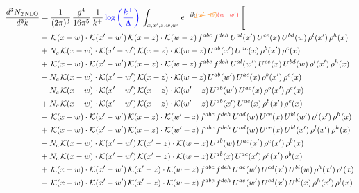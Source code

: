 \documentclass[9pt]{article}
\numberwithin{equation}{section}
\begin{document}
\begin{align}
\frac{d^{3}N_{2\,\mathrm{NLO}}}{d^{3}k} & = \frac{1}{(2\pi)^{3}}\,\frac{g^{4}}{16\pi^{5}}\,\frac{1}{k^{+}}\,{\color{blue}\log{\left(\frac{k^{+}}{\Lambda}\right)}}\,\int_{x,x',z,w,w'}e^{-ik{\color{orange}\cancel{(w'-w)}}{\color{red}(w-w')}}\,\Bigg[\notag\\ & -\,\mathcal{K}(x-w)\cdot\mathcal{K}(x'-w')\,\mathcal{K}(x-z)\cdot\mathcal{K}(w-z)\,f^{abc}\,f^{deh}\,U^{al}(x')\,U^{ce}(x)\,U^{bd}(w)\,\rho^{l}(x')\,\rho^{h}(x)\notag\\
& +N_{c}\,\mathcal{K}(x-w)\cdot\mathcal{K}(x'-w')\,\mathcal{K}(x-z)\cdot\mathcal{K}(w-z)\,U^{ab}(x')\,U^{ac}(x)\,\rho^{b}(x')\,\rho^{c}(x)\notag\\
& +\,\mathcal{K}(x-w)\cdot\mathcal{K}(x'-w')\,\mathcal{K}(x-z)\cdot\mathcal{K}(w-z)\,f^{abc}\,f^{deh}\,U^{al}(w')\,U^{ce}(x)\,U^{bd}(w)\,\rho^{l}(x')\,\rho^{h}(x)\notag\\
& -N_{c}\,\mathcal{K}(x-w)\cdot\mathcal{K}(x'-w')\,\mathcal{K}(x-z)\cdot\mathcal{K}(w-z)\,U^{ab}(w')\,U^{ac}(x)\,\rho^{b}(x')\,\rho^{c}(x)\notag\\
& -N_{c}\,\mathcal{K}(x-w)\cdot\mathcal{K}(x'-w')\,\mathcal{K}(x-z)\cdot\mathcal{K}(w'-z)\,U^{ab}(w')\,U^{ac}(x)\,\rho^{b}(x')\,\rho^{c}(x)\notag\\
& +N_{c}\,\mathcal{K}(x-w)\cdot\mathcal{K}(x'-w')\,\mathcal{K}(x-z)\cdot\mathcal{K}(w'-z)\,U^{ab}(x')\,U^{ac}(x)\,\rho^{b}(x')\,\rho^{c}(x)\notag\\
& -\,\mathcal{K}(x-w)\cdot\mathcal{K}(x'-w')\,\mathcal{K}(x-z)\cdot\mathcal{K}(w'-z)\,f^{abc}\,f^{deh}\,U^{ad}(w)\,U^{ce}(x)\,U^{bl}(w')\,\rho^{l}(x')\,\rho^{h}(x)\notag\\
& +\,\mathcal{K}(x-w)\cdot\mathcal{K}(x'-w')\,\mathcal{K}(x-z)\cdot\mathcal{K}(w'-z)\,f^{abc}\,f^{deh}\,U^{ad}(w)\,U^{ce}(x)\,U^{bl}(x')\,\rho^{l}(x')\,\rho^{h}(x)\notag\\
& -N_{c}\,\mathcal{K}(x-w)\cdot\mathcal{K}(x'-w')\,\mathcal{K}(x'-z)\cdot\mathcal{K}(w-z)\,U^{ab}(w)\,U^{ac}(x')\,\rho^{c}(x')\,\rho^{b}(x)\notag\\
& +N_{c}\,\mathcal{K}(x-w)\cdot\mathcal{K}(x'-w')\,\mathcal{K}(x'-z)\cdot\mathcal{K}(w-z)\,U^{ab}(x)\,U^{ac}(x')\,\rho^{c}(x')\,\rho^{b}(x)\notag\\
& +\,\mathcal{K}(x-w)\cdot\mathcal{K}(x'-w')\,\mathcal{K}(x'-z)\cdot\mathcal{K}(w-z)\,f^{abc}\,f^{deh}\,U^{ae}(w')\,U^{cd}(x')\,U^{bl}(w)\,\rho^{h}(x')\,\rho^{l}(x)\notag\\
& -\,\mathcal{K}(x-w)\cdot\mathcal{K}(x'-w')\,\mathcal{K}(x'-z)\cdot\mathcal{K}(w-z)\,f^{abc}\,f^{deh}\,U^{ae}(w')\,U^{cd}(x')\,U^{bl}(x)\,\rho^{h}(x')\,\rho^{l}(x)\notag\\

\end{align}
\end{document}
